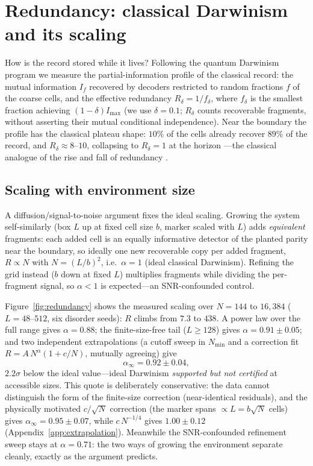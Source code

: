 \documentclass[aps,pre,twocolumn,superscriptaddress,nofootinbib,longbibliography]{revtex4-2}
\begin{document}
\section{Redundancy: classical Darwinism and its scaling}
\label{sec:redundancy}

How is the record stored while it lives? Following the quantum Darwinism program
\cite{zurek2009darwinism,blumekohout2006,riedel2012risefall} we measure the
partial-information profile of the classical record: the mutual information $I_f$ recovered
by decoders restricted to random fractions $f$ of the coarse cells, and the effective
redundancy $R_\delta=1/f_\delta$, where $f_\delta$ is the smallest fraction achieving
$(1-\delta)I_{\max}$ (we use $\delta=0.1$; $R_\delta$ counts recoverable fragments, without
asserting their mutual conditional independence). Near the boundary the profile has the
classical plateau shape: $10\%$ of the cells already recover $89\%$ of the record, and
$R_\delta\approx8$--$10$, collapsing to $R_\delta=1$ at the horizon \cite{repo}---the
classical analogue of the rise and fall of redundancy \cite{riedel2012risefall}.

\subsection{Scaling with environment size}

A diffusion/signal-to-noise argument fixes the ideal scaling. Growing the system
self-similarly (box $L$ up at fixed cell size $b$, marker scaled with $L$) adds
\emph{equivalent} fragments: each added cell is an equally informative detector of the
planted parity near the boundary, so ideally one new recoverable copy per added fragment,
$R\propto N$ with $N=(L/b)^2$, i.e.\ $\alpha=1$ (ideal classical Darwinism). Refining the
grid instead ($b$ down at fixed $L$) multiplies fragments while dividing the per-fragment
signal, so $\alpha<1$ is expected---an SNR-confounded control.

Figure~\ref{fig:redundancy} shows the measured scaling over $N=144$ to $16{,}384$
($L=48$--$512$, six disorder seeds): $R$ climbs from $7.3$ to $438$. A power law over the
full range gives $\alpha=0.88$; the finite-size-free tail ($L\ge128$) gives
$\alpha=0.91\pm0.05$; and two independent extrapolations (a cutoff sweep in $N_{\min}$ and a
correction fit $R=A\,N^{\alpha}(1+c/N)$, mutually agreeing) give
\begin{equation}
\alpha_\infty = 0.92\pm0.04,
\end{equation}
$2.2\sigma$ below the ideal value---ideal Darwinism \emph{supported but not certified} at
accessible sizes. This quote is deliberately conservative: the data cannot distinguish the
form of the finite-size correction (near-identical residuals), and the physically motivated
$c/\sqrt N$ correction (the marker spans $\propto L=b\sqrt N$ cells) gives
$\alpha_\infty=0.95\pm0.07$, while $c\,N^{-1/4}$ gives $1.00\pm0.12$
(Appendix~\ref{app:extrapolation}). Meanwhile the SNR-confounded refinement sweep stays at
$\alpha=0.71$: the two ways of growing the environment separate cleanly, exactly as the
argument predicts.
\end{document}
